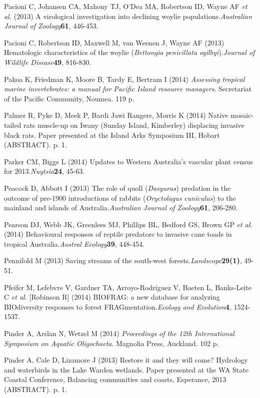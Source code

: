 \documentclass[version=last, paper=a4, DIV=18, usenames, dvipsnames]{scrartcl}
\begin{document}
Pacioni C, Johansen CA, Mahony TJ, O'Dea MA, Robertson ID, Wayne AF \emph{et al.} (2013) A virological investigation into declining woylie populations.\emph{Australian Journal of Zoology}\textbf{61}, 446-453.


Pacioni C, Robertson ID, Maxwell M, van Weenen J, Wayne AF (2013) Hematologic characteristics of the woylie (\emph{Bettongia} \emph{penicillata} \emph{ogilbyi}).\emph{Journal of Wildlife Disease}\textbf{49}, 816-830.


Pakoa K, Friedman K, Moore B, Tardy E, Bertram I (2014) \emph{Assessing tropical marine invertebrates: a manual for Pacific Island resource managers}. Secretariat of the Pacific Community, Noumea. 119 p.


Palmer R, Pyke D, Meek P, Bardi Jawi Rangers, Morris K (2014) Native mosaic-tailed rats muscle-up on Iwany (Sunday Island, Kimberley) displacing invasive black rats. Paper presented at the Island Arks Symposium III, Hobart (ABSTRACT). p. 1.


Parker CM, Biggs L (2014) Updates to Western Australia's vascular plant census for 2013.\emph{Nuytsia}\textbf{24}, 45-63.


Peacock D, Abbott I (2013) The role of quoll (\emph{Dasyurus}) predation in the outcome of pre-1900 introductions of rabbits (\emph{Oryctolagus} \emph{cuniculus}) to the mainland and islands of Australia.\emph{Australian Journal of Zoology}\textbf{61}, 206-280.


Pearson DJ, Webb JK, Greenlees MJ, Phillips BL, Bedford GS, Brown GP \emph{et al.} (2014) Behavioural responses of reptile predators to invasive cane toads in tropical Australia.\emph{Austral Ecology}\textbf{39}, 448-454.


Pennifold M (2013) Saving streams of the south-west forests.\emph{Landscope}\textbf{29(1)}, 49-51.


Pfeifer M, Lefebvre V, Gardner TA, Arroyo-Rodriguez V, Baeten L, Banks-Leite C \emph{et al.} [Robinson R] (2014) BIOFRAG: a new database for analyzing BIOdiversity responses to forest FRAGmentation.\emph{Ecology and Evolution}\textbf{4}, 1524-1537.


Pinder A, Arslan N, Wetzel M (2014) \emph{Proceedings of the 12th International Symposium on Aquatic Oligochaeta}. Magnolia Press, Auckland. 102 p.


Pinder A, Cale D, Lizamore J (2013) Restore it and they will come? Hydrology and waterbirds in the Lake Warden wetlands. Paper presented at the WA State Coastal Conference, Balancing communities and coasts, Esperance, 2013 (ABSTRACT). p. 1.
\end{document}
